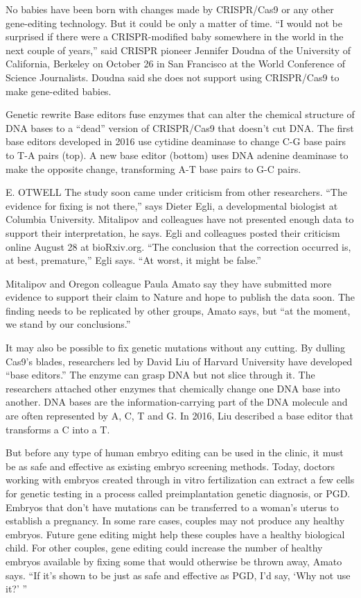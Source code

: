 \documentclass[12pt]{article}
\begin{document}
No babies have been born with changes made by CRISPR/Cas9 or any other gene-editing technology. But it could be only a matter of time. “I would not be surprised if there were a CRISPR-modified baby somewhere in the world in the next couple of years,” said CRISPR pioneer Jennifer Doudna of the University of California, Berkeley on October 26 in San Francisco at the World Conference of Science Journalists. Doudna said she does not support using CRISPR/Cas9 to make gene-edited babies.

Genetic rewrite
Base editors fuse enzymes that can alter the chemical structure of DNA bases to a “dead” version of CRISPR/Cas9 that doesn’t cut DNA. The first base editors developed in 2016 use cytidine deaminase to change C-G base pairs to T-A pairs (top). A new base editor (bottom) uses DNA adenine deaminase to make the opposite change, transforming A-T base pairs to G-C pairs.


E. OTWELL
The study soon came under criticism from other researchers. “The evidence for fixing is not there,” says Dieter Egli, a developmental biologist at Columbia University. Mitalipov and colleagues have not presented enough data to support their interpretation, he says. Egli and colleagues posted their criticism online August 28 at bioRxiv.org. “The conclusion that the correction occurred is, at best, premature,” Egli says. “At worst, it might be false.”

Mitalipov and Oregon colleague Paula Amato say they have submitted more evidence to support their claim to Nature and hope to publish the data soon. The finding needs to be replicated by other groups, Amato says, but “at the moment, we stand by our conclusions.”

It may also be possible to fix genetic mutations without any cutting. By dulling Cas9’s blades, researchers led by David Liu of Harvard University have developed “base editors.” The enzyme can grasp DNA but not slice through it. The researchers attached other enzymes that chemically change one DNA base into another. DNA bases are the information-carrying part of the DNA molecule and are often represented by A, C, T and G. In 2016, Liu described a base editor that transforms a C into a T.


But before any type of human embryo editing can be used in the clinic, it must be as safe and effective as existing embryo screening methods. Today, doctors working with embryos created through in vitro fertilization can extract a few cells for genetic testing in a process called preimplantation genetic diagnosis, or PGD. Embryos that don’t have mutations can be transferred to a woman’s uterus to establish a pregnancy. In some rare cases, couples may not produce any healthy embryos. Future gene editing might help these couples have a healthy biological child. For other couples, gene editing could increase the number of healthy embryos available by fixing some that would otherwise be thrown away, Amato says. “If it’s shown to be just as safe and effective as PGD, I’d say, ‘Why not use it?’ ”
\end{document}
